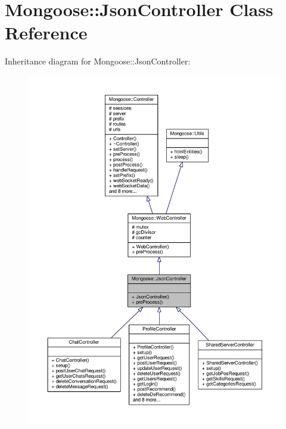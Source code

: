 \hypertarget{classMongoose_1_1JsonController}{}\section{Mongoose\+:\+:Json\+Controller Class Reference}
\label{classMongoose_1_1JsonController}


Inheritance diagram for Mongoose\+:\+:Json\+Controller\+:
\nopagebreak
\begin{figure}[H]
\begin{center}
\leavevmode
\includegraphics[width=350pt]{d4/d71/classMongoose_1_1JsonController__inherit__graph}
\end{center}
\end{figure}



